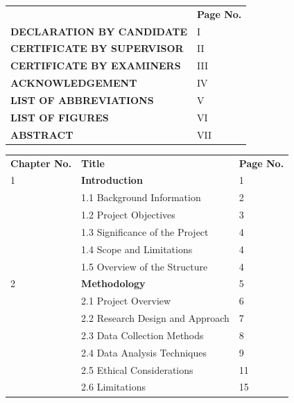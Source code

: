 \normalsize
\begin{center}
  \renewcommand{\arraystretch}{1.5} %
  \begin{tabular}{p{12cm} p{2cm}}
    & \textbf{Page No.} \\
    \textbf{DECLARATION BY CANDIDATE} & I \\
    \textbf{CERTIFICATE BY SUPERVISOR} & II \\
    \textbf{CERTIFICATE BY EXAMINERS} & III \\
    \textbf{ACKNOWLEDGEMENT} & IV \\
    \textbf{LIST OF ABBREVIATIONS} & V \\
    \textbf{LIST OF FIGURES} & VI \\
    \textbf{ABSTRACT} & VII \\
  \end{tabular}

  
\end{center}

\begin{center}
  \renewcommand{\arraystretch}{1.5} %
  \begin{tabular}{p{2cm} p{10cm} p{2cm}}
    

\textbf{Chapter No.} & \textbf{Title} & \textbf{Page No.} \\
    1 & \textbf{Introduction} & 1 \\
  & 1.1 Background Information & 2 \\
  & 1.2 Project Objectives & 3 \\
  & 1.3 Significance of the Project & 4 \\
  & 1.4 Scope and Limitations & 4 \\
  & 1.5 Overview of the Structure & 4 \\
  
2 & \textbf{Methodology} & 5 \\
  & 2.1 Project Overview & 6 \\
  & 2.2 Research Design and Approach & 7 \\
  & 2.3 Data Collection Methods & 8 \\
  & 2.4 Data Analysis Techniques & 9 \\
  & 2.5 Ethical Considerations & 11 \\
  & 2.6 Limitations & 15 \\

  \end{tabular}
\end{center}


